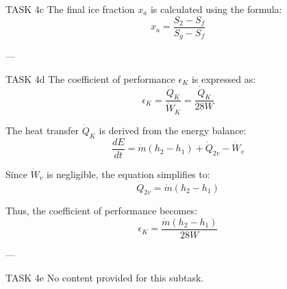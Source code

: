 TASK 4c  
The final ice fraction \( x_a \) is calculated using the formula:  
\[
x_a = \frac{S_2 - S_f}{S_g - S_f}
\]

---

TASK 4d  
The coefficient of performance \( \epsilon_K \) is expressed as:  
\[
\epsilon_K = \frac{\dot{Q}_K}{\dot{W}_K} = \frac{\dot{Q}_K}{28W}
\]

The heat transfer \( \dot{Q}_K \) is derived from the energy balance:  
\[
\frac{dE}{dt} = \dot{m}(h_2 - h_1) + \dot{Q}_{2v} - \dot{W}_v
\]

Since \( \dot{W}_v \) is negligible, the equation simplifies to:  
\[
\dot{Q}_{2v} = \dot{m}(h_2 - h_1)
\]

Thus, the coefficient of performance becomes:  
\[
\epsilon_K = \frac{\dot{m}(h_2 - h_1)}{28W}
\]

---

TASK 4e  
No content provided for this subtask.